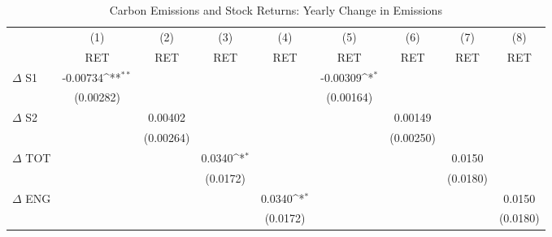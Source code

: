 \begin{table}[htbp]\centering
\def\sym#1{\ifmmode^{#1}\else\(^{#1}\)\fi}
\caption{Carbon Emissions and Stock Returns: Yearly Change in Emissions}
\begin{tabular}{l*{8}{c}}
\hline\hline
                    &\multicolumn{1}{c}{(1)}&\multicolumn{1}{c}{(2)}&\multicolumn{1}{c}{(3)}&\multicolumn{1}{c}{(4)}&\multicolumn{1}{c}{(5)}&\multicolumn{1}{c}{(6)}&\multicolumn{1}{c}{(7)}&\multicolumn{1}{c}{(8)}\\
                    &\multicolumn{1}{c}{RET}&\multicolumn{1}{c}{RET}&\multicolumn{1}{c}{RET}&\multicolumn{1}{c}{RET}&\multicolumn{1}{c}{RET}&\multicolumn{1}{c}{RET}&\multicolumn{1}{c}{RET}&\multicolumn{1}{c}{RET}\\
\hline
$\Delta$ S1         &    -0.00734\sym{**} &                     &                     &                     &    -0.00309\sym{*}  &                     &                     &                     \\
                    &   (0.00282)         &                     &                     &                     &   (0.00164)         &                     &                     &                     \\
$\Delta$ S2         &                     &     0.00402         &                     &                     &                     &     0.00149         &                     &                     \\
                    &                     &   (0.00264)         &                     &                     &                     &   (0.00250)         &                     &                     \\
$\Delta$ TOT        &                     &                     &      0.0340\sym{*}  &                     &                     &                     &      0.0150         &                     \\
                    &                     &                     &    (0.0172)         &                     &                     &                     &    (0.0180)         &                     \\
$\Delta$ ENG        &                     &                     &                     &      0.0340\sym{*}  &                     &                     &                     &      0.0150         \\
                    &                     &                     &                     &    (0.0172)         &                     &                     &                     &    (0.0180)         \\

\end{tabular}
\end{table}
